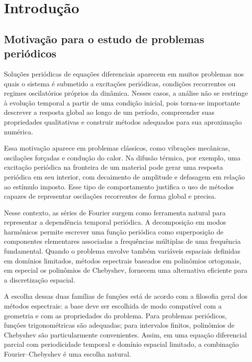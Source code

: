 \chapter{Introdução}

\section{Motivação para o estudo de problemas periódicos}

Soluções periódicas de equações diferenciais aparecem em muitos problemas nos quais o sistema é submetido a excitações periódicas, condições recorrentes ou regimes oscilatórios próprios da dinâmica. Nesses casos, a análise não se restringe à evolução temporal a partir de uma condição inicial, pois torna-se importante descrever a resposta global ao longo de um período, compreender suas propriedades qualitativas e construir métodos adequados para sua aproximação numérica.

Essa motivação aparece em problemas clássicos, como vibrações mecânicas, oscilações forçadas e condução do calor. Na difusão térmica, por exemplo, uma excitação periódica na fronteira de um material pode gerar uma resposta periódica em seu interior, com decaimento de amplitude e defasagem em relação ao estímulo imposto. Esse tipo de comportamento justifica o uso de métodos capazes de representar oscilações recorrentes de forma global e precisa.

Nesse contexto, as séries de Fourier surgem como ferramenta natural para representar a dependência temporal periódica. A decomposição em modos harmônicos permite escrever uma função periódica como superposição de componentes elementares associadas a frequências múltiplas de uma frequência fundamental. Quando o problema envolve também variáveis espaciais definidas em domínios limitados, métodos espectrais baseados em polinômios ortogonais, em especial os polinômios de Chebyshev, fornecem uma alternativa eficiente para a discretização espacial.

A escolha dessas duas famílias de funções está de acordo com a filosofia geral dos métodos espectrais: a base deve ser escolhida de modo compatível com a geometria e com as propriedades do problema. Para problemas periódicos, funções trigonométricas são adequadas; para intervalos finitos, polinômios de Chebyshev são particularmente convenientes. Assim, em uma equação diferencial parcial com periodicidade temporal e domínio espacial limitado, a combinação Fourier--Chebyshev é uma escolha natural.

